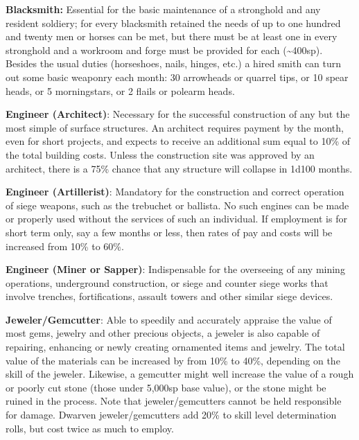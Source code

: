 \documentclass{article}
\begin{document}
\begin{multicols}{2}
\textbf{Blacksmith:} Essential for the basic maintenance of a stronghold
and any resident soldiery; for every blacksmith retained the needs of up
to one hundred and twenty men or horses can be met, but there must be at
least one in every stronghold and a workroom and forge must be provided
for each (\textasciitilde400sp). Besides the usual duties (horseshoes,
nails, hinges, etc.) a hired smith can turn out some basic weaponry each
month: 30 arrowheads or quarrel tips, or 10 spear heads, or 5
morningstars, or 2 flails or polearm heads.

\textbf{Engineer (Architect)}: Necessary for the successful construction
of any but the most simple of surface structures. An architect requires
payment by the month, even for short projects, and expects to receive an
additional sum equal to 10\% of the total building costs. Unless the
construction site was approved by an architect, there is a 75\% chance
that any structure will collapse in 1d100 months.

\textbf{Engineer (Artillerist)}: Mandatory for the construction and
correct operation of siege weapons, such as the trebuchet or ballista.
No such engines can be made or properly used without the services of
such an individual. If employment is for short term only, say a few
months or less, then rates of pay and costs will be increased from 10\%
to 60\%.

\textbf{Engineer (Miner or Sapper)}: Indispensable for the overseeing of
any mining operations, underground construction, or siege and counter
siege works that involve trenches, fortifications, assault towers and
other similar siege devices.

\textbf{Jeweler/Gemcutter}: Able to speedily and accurately appraise the
value of most gems, jewelry and other precious objects, a jeweler is
also capable of repairing, enhancing or newly creating ornamented items
and jewelry. The total value of the materials can be increased by from
10\% to 40\%, depending on the skill of the jeweler. Likewise, a
gemcutter might well increase the value of a rough or poorly cut stone
(those under 5,000sp base value), or the stone might be ruined in the
process. Note that jeweler/gemcutters cannot be held responsible for
damage. Dwarven jeweler/gemcutters add 20\% to skill level determination
rolls, but cost twice as much to employ.


\end{multicols}
\end{document}
